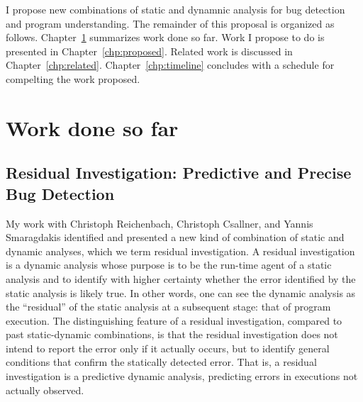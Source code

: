 \documentclass[proposal]{umthesis} %
\begin{document}
I propose new combinations of static and dynamnic analysis for bug detection and program understanding.  The remainder of this proposal is organized as follows.  Chapter~\ref{chp:worksofar} summarizes work done so far.  Work I propose to do is presented in Chapter~\ref{chp:proposed}.  Related work is discussed in Chapter~\ref{chp:related}.  Chapter~\ref{chp:timeline} concludes with a schedule for compelting the work proposed.   


\chapter{Work done so far}
\label{chp:worksofar}

\section{Residual Investigation: Predictive and Precise Bug Detection}

My work\cite{rfbi-issta12} with Christoph Reichenbach, Christoph Csallner, and Yannis Smaragdakis identified and presented a new kind of combination of static and dynamic analyses, which we term residual investigation. A residual investigation is a dynamic analysis whose purpose is to be the run-time agent of a static analysis and to identify with higher certainty whether the error identified by the static analysis is likely true.  In other words, one can see the dynamic analysis as the “residual” of the static analysis at a subsequent stage: that of program execution. The distinguishing feature of a residual investigation, compared to past static-dynamic combinations, is that the residual investigation does not intend to report the error only if it actually occurs, but to identify general conditions that confirm the statically detected error. That is, a residual investigation is a predictive dynamic analysis, predicting errors in executions not actually observed.
\end{document}
